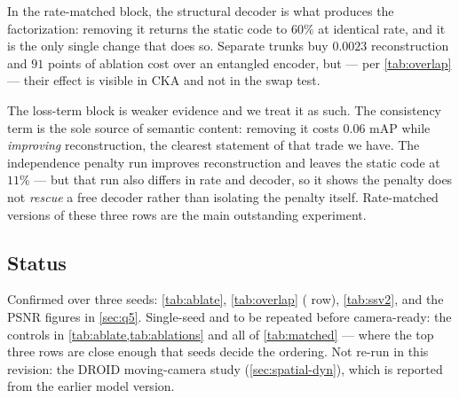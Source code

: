 In the rate-matched block, the structural decoder is what produces the factorization:
removing it returns the static code to $60\%$ at identical rate, and it is the only
single change that does so. Separate trunks buy $0.0023$ reconstruction and $91$ points
of ablation cost over an entangled encoder, but --- per \cref{tab:overlap} --- their
effect is visible in CKA and not in the swap test.

The loss-term block is weaker evidence and we treat it as such. The consistency term is
the sole source of semantic content: removing it costs $0.06$ mAP while \emph{improving}
reconstruction, the clearest statement of that trade we have. The independence penalty
run improves reconstruction and leaves the static code at $11\%$ --- but that run also
differs in rate and decoder, so it shows the penalty does not \emph{rescue} a free
decoder rather than isolating the penalty itself. Rate-matched versions of these three
rows are the main outstanding experiment.

\subsection{Status}
\label{sec:plan}
Confirmed over three seeds: \cref{tab:ablate}, \cref{tab:overlap} (\method{} row),
\cref{tab:ssv2}, and the PSNR figures in \cref{sec:q5}. Single-seed and to be repeated
before camera-ready: the controls in \cref{tab:ablate,tab:ablations} and all of
\cref{tab:matched} --- where the top three rows are close enough that seeds decide the
ordering. Not re-run in this revision: the DROID moving-camera study
(\cref{sec:spatial-dyn}), which is reported from the earlier model version.
